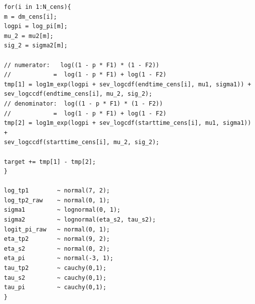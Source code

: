 \documentclass[12pt]{article}
\begin{document}
{\begin{verbatim}
for(i in 1:N_cens){
m = dm_cens[i];
logpi = log_pi[m];
mu_2 = mu2[m];
sig_2 = sigma2[m];

// numerator:   log((1 - p * F1) * (1 - F2))
//            =  log(1 - p * F1) + log(1 - F2)
tmp[1] = log1m_exp(logpi + sev_logcdf(endtime_cens[i], mu1, sigma1)) +
sev_logccdf(endtime_cens[i], mu_2, sig_2);
// denominator:  log((1 - p * F1) * (1 - F2))
//            =  log(1 - p * F1) + log(1 - F2)
tmp[2] = log1m_exp(logpi + sev_logcdf(starttime_cens[i], mu1, sigma1)) +
sev_logccdf(starttime_cens[i], mu_2, sig_2);

target += tmp[1] - tmp[2];
}

log_tp1        ~ normal(7, 2);
log_tp2_raw    ~ normal(0, 1);
sigma1         ~ lognormal(0, 1);
sigma2         ~ lognormal(eta_s2, tau_s2);
logit_pi_raw   ~ normal(0, 1);
eta_tp2        ~ normal(9, 2);
eta_s2         ~ normal(0, 2);
eta_pi         ~ normal(-3, 1);
tau_tp2        ~ cauchy(0,1);
tau_s2         ~ cauchy(0,1);
tau_pi         ~ cauchy(0,1);
}

\end{verbatim}
}

\pagebreak
\end{document}
